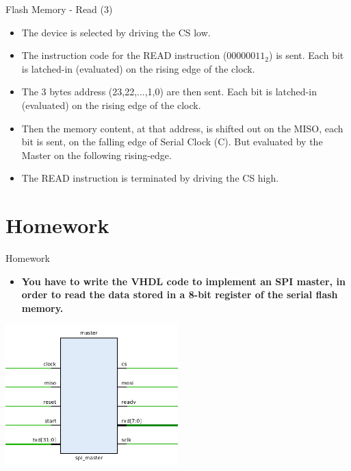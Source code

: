 \documentclass[ignorenonframetext,aspectratio=43,]{beamer}
\providecommand{\tightlist}{%
  \setlength{\itemsep}{0pt}\setlength{\parskip}{0pt}}
\begin{document}
\begin{frame}{Flash Memory - Read (3)}
\protect\hypertarget{flash-memory---read-3}{}

\begin{itemize}
\item
  The device is selected by driving the CS low.
\item
  The instruction code for the READ instruction (\(00000011_2\)) is
  sent. Each bit is latched-in (evaluated) on the rising edge of the
  clock.
\item
  The 3 bytes address (23,22,...,1,0) are then sent. Each bit is
  latched-in (evaluated) on the rising edge of the clock.
\item
  Then the memory content, at that address, is shifted out on the MISO,
  each bit is sent, on the falling edge of Serial Clock (C). But
  evaluated by the Master on the following rising-edge.
\item
  The READ instruction is terminated by driving the CS high.
\end{itemize}

\end{frame}

\hypertarget{homework}{%
\part{Homework}\label{homework}}

\begin{frame}{Homework}
\protect\hypertarget{homework-1}{}

\begin{itemize}
\tightlist
\item
  \textbf{You have to write the VHDL code to implement an SPI master, in
  order to read the data stored in a 8-bit register of the serial flash
  memory.}
\end{itemize}

\includegraphics[width=0.5\textwidth,height=\textheight]{images/master}

\end{frame}
\end{document}
